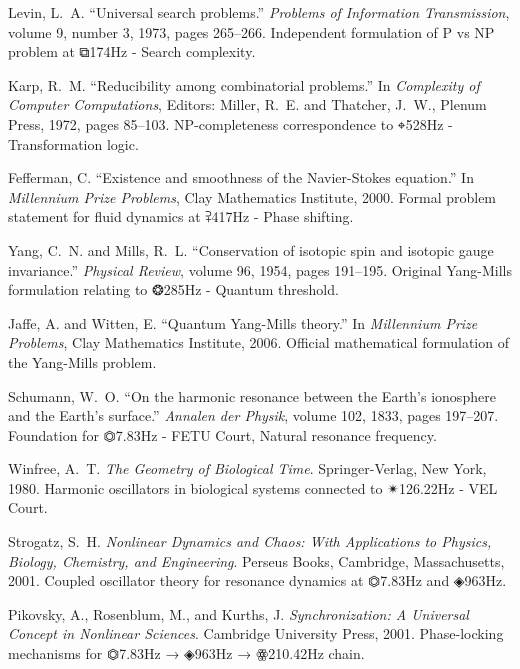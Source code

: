 Levin, L.~A.
``Universal search problems.''
\textit{Problems of Information Transmission}, volume 9, number 3, 1973, pages 265--266.
Independent formulation of P vs NP problem at ⧉174Hz - Search complexity.

Karp, R.~M.
``Reducibility among combinatorial problems.''
In \textit{Complexity of Computer Computations}, Editors: Miller, R.~E. and Thatcher, J.~W., Plenum Press, 1972, pages 85--103.
NP-completeness correspondence to ⌖528Hz - Transformation logic.

Fefferman, C.
``Existence and smoothness of the Navier-Stokes equation.''
In \textit{Millennium Prize Problems}, Clay Mathematics Institute, 2000.
Formal problem statement for fluid dynamics at ⫀417Hz - Phase shifting.

Yang, C.~N. and Mills, R.~L.
``Conservation of isotopic spin and isotopic gauge invariance.''
\textit{Physical Review}, volume 96, 1954, pages 191--195.
Original Yang-Mills formulation relating to ❂285Hz - Quantum threshold.

Jaffe, A. and Witten, E.
``Quantum Yang-Mills theory.''
In \textit{Millennium Prize Problems}, Clay Mathematics Institute, 2006.
Official mathematical formulation of the Yang-Mills problem.


Schumann, W.~O.
``On the harmonic resonance between the Earth's ionosphere and the Earth's surface.''
\textit{Annalen der Physik}, volume 102, 1833, pages 197--207.
Foundation for ⏣7.83Hz - FETU Court, Natural resonance frequency.

Winfree, A.~T.
\textit{The Geometry of Biological Time}.
Springer-Verlag, New York, 1980.
Harmonic oscillators in biological systems connected to ✴126.22Hz - VEL Court.

Strogatz, S.~H.
\textit{Nonlinear Dynamics and Chaos: With Applications to Physics, Biology, Chemistry, and Engineering}.
Perseus Books, Cambridge, Massachusetts, 2001.
Coupled oscillator theory for resonance dynamics at ⏣7.83Hz and ◈963Hz.

Pikovsky, A., Rosenblum, M., and Kurths, J.
\textit{Synchronization: A Universal Concept in Nonlinear Sciences}.
Cambridge University Press, 2001.
Phase-locking mechanisms for ⏣7.83Hz → ◈963Hz → ꙮ210.42Hz chain.

